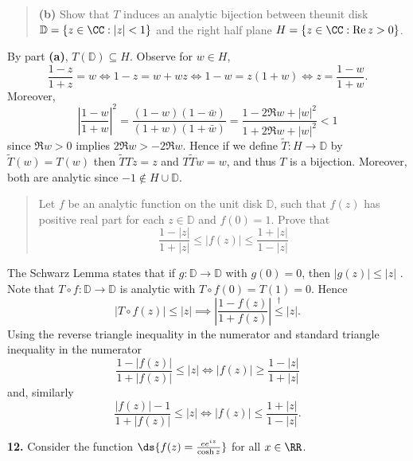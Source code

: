 \documentclass{homework}
\begin{document}
\begin{quote}
  {\bf (b)} Show that $T$ induces an analytic bijection between theunit disk $\mathbb D = \{z \in \CC:|z|<1\}$ and the right half plane $H = \{z\in \CC:\Re z>0\}$.
\end{quote}

\begin{solution}
  By part {\bf(a)}, $T(\mathbb D) \subseteq H$. Observe for $w \in H$,
  $$
    \frac{1-z}{1+z} = w \iff 1-z = w+wz \iff 1-w = z(1+w) \iff z = \frac{1-w}{1+w}.
  $$
  Moreover,
  $$
    \left|\frac{1-w}{1+w}\right|^2 = \frac{(1-w)(1-\bar w)}{(1+w)(1+\bar w)} = \frac{1-2\Re w + |w|^2}{1+2\Re w + |w|^2} < 1
  $$
  since $\Re w > 0$ implies $2\Re w > -2\Re w$. Hence if we define $\tilde T:H\to \mathbb D$ by $\tilde T(w) = T(w)$ then $\tilde T T z = z$ and $T\tilde T w = w$, and thus $T$ is a bijection. Moreover, both are analytic since $-1 \notin H\cup\mathbb D$.
\end{solution}

\begin{quote}
  Let $f$ be an analytic function on the unit disk $\mathbb D$, such that $f(z)$ has positive real part for each $z\in\mathbb D$ and $f(0)=1$.  Prove that 
  $$
    \frac{1-|z|}{1+|z|}\le |f(z)| \le \frac{1+|z|}{1-|z|}
  $$
\end{quote}

\begin{solution}
  The Schwarz Lemma states that if $g:\mathbb D \to \mathbb D$ with $g(0) = 0$, then $|g(z)|\le |z|$ \cite{boes10}. Note that $T\circ f :\mathbb D\to \mathbb D$ is analytic with $T\circ f(0) = T(1) = 0$. Hence
  $$
    |T\circ f(z)|\le |z| \implies \left|\frac{1 - f(z)}{1+f(z)}\right| \stackrel\dagger\le |z|.
  $$
  Using the reverse triangle inequality in the numerator and standard triangle inequality in the numerator
  $$
    \frac{1 - |f(z)|}{1 + |f(z)|} \le |z| \iff |f(z)| \ge \frac{1 - |z|}{1+|z|}
  $$
  and, similarly
  $$
    \frac{|f(z)| - 1}{1+|f(z)|} \le |z| \iff |f(z)| \le \frac{ 1 + |z|}{1 - |z|}.
  $$
\end{solution}

{\bf 12.} Consider the function $\ds{f(z) = \frac{ee^{iz}}{\cosh z}}$ for all $x\in \RR$.
\end{document}
